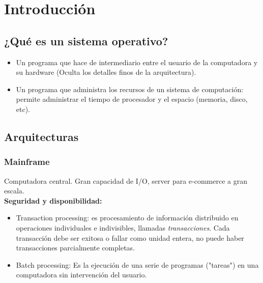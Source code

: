 \documentclass[a4paper, twoside]{article}
\newcommand{\rutapaquetes}{./paquetes-apunte}
\begin{document}
\maketitle %

\tableofcontents %



\section{Introducción}
\subsection{¿Qué es un sistema operativo?}
\begin{itemize}
	\item Un programa que hace de intermediario entre el usuario de la computadora y su hardware (Oculta los detalles finos de la arquitectura).
	\item Un programa que administra los recursos de un sistema de computación: permite administrar el tiempo de procesador y el espacio (memoria, disco, etc).
\end{itemize}

\subsection{Arquitecturas}
\subsubsection{Mainframe}
Computadora central. Gran capacidad de I/O, server para e-commerce a gran escala.\\

\textbf{Seguridad y disponibilidad:} 
\begin{itemize}
	\item Transaction processing: es procesamiento de información distribuido en operaciones individuales e indivisibles, llamadas \emph{transacciones}. Cada transacción debe ser exitosa o fallar como unidad entera, no puede haber transacciones parcialmente completas.
	\item Batch processing: Es la ejecución de una serie de programas ("tareas") en una computadora sin intervención del usuario.
\end{itemize}
\end{document}
